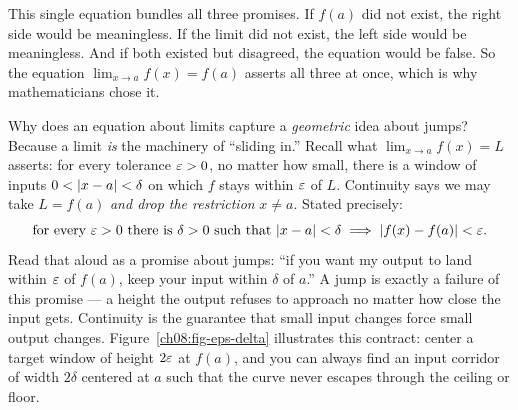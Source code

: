 This single equation bundles all three promises. If $f(a)$ did not exist, the
right side would be meaningless. If the limit did not exist, the left side would be
meaningless. And if both existed but disagreed, the equation would be false. So the
equation $\lim_{x\to a} f(x) = f(a)$ asserts all three at once, which is why
mathematicians chose it.

\begin{happeningbox}
Why does an equation about limits capture a \emph{geometric} idea about jumps? Because a
limit \emph{is} the machinery of ``sliding in.'' Recall what $\lim_{x\to a} f(x)=L$
asserts: for every tolerance $\varepsilon>0$, no matter how small, there is a window of inputs
$0<\lvert x-a\rvert<\delta$ on which $f$ stays within $\varepsilon$ of $L$. Continuity says we may take
$L=f(a)$ \emph{and drop the restriction} $x\ne a$. Stated precisely:
\[
  \text{for every } \varepsilon>0 \text{ there is } \delta>0 \text{ such that }
  \lvert x-a\rvert<\delta \implies \lvert f(x)-f(a)\rvert<\varepsilon.
\]
Read that aloud as a promise about jumps: ``if you want my output to land within $\varepsilon$
of $f(a)$, keep your input within $\delta$ of $a$.'' A jump is exactly a failure of
this promise --- a height the output refuses to approach no matter how close the input
gets. Continuity is the guarantee that small input changes force small output changes.
Figure~\ref{ch08:fig-eps-delta} illustrates this
contract: center a target window of height $2\varepsilon$ at $f(a)$, and you can always find an
input corridor of width $2\delta$ centered at $a$ such that the curve never escapes
through the ceiling or floor.
\end{happeningbox}

